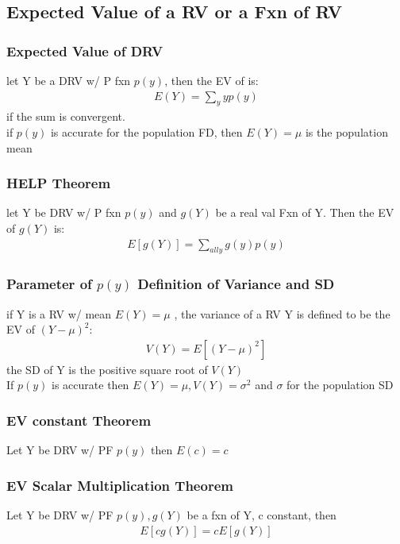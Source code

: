 \documentclass[12pt]{article}
\begin{document}
\subsection{Expected Value of a RV or a Fxn of RV}
    \subsubsection{Expected Value of DRV}
        let Y be a DRV w/ P fxn $ p(y) $, then the EV of is:
        \begin{align*}
            E(Y) = \sum_{y}yp(y)
        \end{align*}
        if the sum is convergent.\\
        if $ p(y) $ is accurate for the population FD, then $ E(Y) = \mu $
        is the population mean
    \subsubsection{ HELP Theorem }
        let Y be DRV w/ P fxn $ p(y) $ and $ g(Y) $ be a real val Fxn of Y.
        Then the EV of $ g(Y) $ is:
        \begin{align*}
            E[g(Y)] = \sum_{all y}g(y)p(y)
        \end{align*}
    \subsubsection{Parameter of $ p(y) $ Definition of Variance and SD}
        if Y is a RV w/ mean $ E(Y) = \mu $ , the variance of a RV Y is defined
        to be the EV of $ (Y - \mu )^2  $:
        \begin{align*}
            V(Y) = E[(Y - \mu )^2 ]
        \end{align*}
        the SD of Y is the positive square root of $ V(Y) $\\
        If $ p(y) $ is accurate then $ E(Y) = \mu , V(Y) = \sigma ^2  $
        and $ \sigma $ for the population SD
    \subsubsection{EV constant Theorem}
        Let Y be DRV w/ PF $ p(y) $ then $ E(c) = c $
    \subsubsection{EV Scalar Multiplication Theorem}
        Let Y be DRV w/ PF $ p(y) , g(Y)$ be a fxn of Y, c constant, then
        \begin{align*}
            E[cg(Y)] = cE[g(Y)]
        \end{align*}
\end{document}
